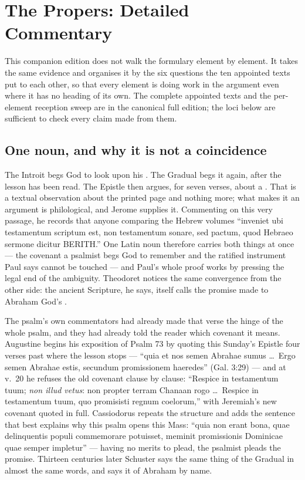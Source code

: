 \sectionguard
\section*{The Propers: Detailed Commentary}

This companion edition does not walk the formulary element by element. It
takes the same evidence and organises it by the six questions the ten
appointed texts put to each other, so that every element is doing work in the
argument even where it has no heading of its own. The complete appointed texts
and the per-element reception sweep are in the canonical full edition; the
loci below are sufficient to check every claim made from them.

\subsection*{One noun, and why it is not a coincidence}

The Introit begs God to look upon his . The Gradual begs it
again, after the lesson has been read. The Epistle then argues, for seven
verses, about a . That is a textual
observation about the printed page and nothing more; what makes it an argument
is philological, and Jerome supplies it. Commenting on this very passage, he
records that anyone comparing the Hebrew volumes ``inveniet ubi testamentum
scriptum est, non testamentum sonare, sed pactum, quod Hebraeo sermone dicitur
BERITH.'' One Latin noun therefore carries both things at once --- the covenant
a psalmist begs God to remember and the ratified instrument Paul says cannot be
touched --- and Paul's whole proof works by pressing the legal end of the
ambiguity. Theodoret notices the same convergence from the other side: the
ancient Scripture, he says, itself calls the promise made to Abraham God's
.

The psalm's own commentators had already made that verse the hinge of the whole
psalm, and they had already told the reader which covenant it means. Augustine
begins his exposition of Psalm 73 by quoting this Sunday's Epistle four verses
past where the lesson stops --- ``quia et nos semen Abrahae sumus \dots\ Ergo
semen Abrahae estis, secundum promissionem haeredes'' (Gal. 3:29) --- and at
v.~20 he refuses the old covenant clause by clause: ``Respice in testamentum
tuum; \emph{non illud vetus}: non propter terram Chanaan rogo \dots\ Respice in
testamentum tuum, quo promisisti regnum coelorum,'' with Jeremiah's new covenant
quoted in full. Cassiodorus repeats the structure and adds the sentence that
best explains why this psalm opens this Mass: ``quia non erant bona, quae
delinquentis populi commemorare potuisset, meminit promissionis Dominicae quae
semper impletur'' --- having no merits to plead, the psalmist pleads the
promise. Thirteen centuries later Schuster says the same thing of the Gradual
in almost the same words, and says it of Abraham by name.

